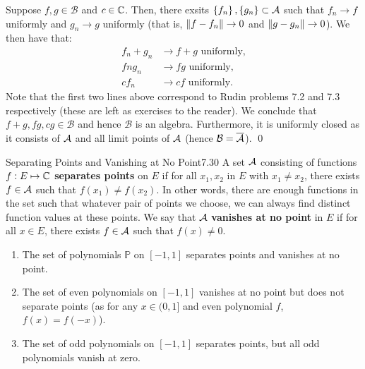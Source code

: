 \begin{nproof}
    Suppose $f, g \in \mathcal{B}$ and $c \in \mathbb{C}$. Then, there exsits $\set{f_n}, \set{g_n} \subset \mathcal{A}$ such that $f_n \rightarrow f$ uniformly and $g_n \rightarrow g$ uniformly (that is, $\norm{f - f_n} \rightarrow 0$ and $\norm{g - g_n} \rightarrow 0$). We then have that:
    \begin{align*}
        f_n + g_n &\rightarrow f + g \text{ uniformly,}
        \\ fng_n &\rightarrow fg \text{ uniformly,}
        \\ cf_n &\rightarrow cf \text{ uniformly.}
    \end{align*}
    Note that the first two lines above correspond to Rudin problems 7.2 and 7.3 respectively (these are left as exercises to the reader). We conclude that $f+g, fg, cg \in \mathcal{B}$ and hence $\mathcal{B}$ is an algebra. Furthermore, it is uniformly closed as it consists of $\mathcal{A}$ and all limit points of $\mathcal{A}$ (hence $\mathcal{B} = \overline{\mathcal{A}}$). \qed
\end{nproof}

\begin{definition}{Separating Points and Vanishing at No Point}{7.30}
    A set $\mathcal{A}$ consisting of functions $f: E \mapsto \mathbb{C}$ \textbf{separates points} on $E$ if for all $x_1, x_2$ in $E$ with $x_1 \neq x_2$, there exists $f \in \mathcal{A}$ such that $f(x_1) \neq f(x_2)$. In other words, there are enough functions in the set such that whatever pair of points we choose, we can always find distinct function values at these points. We say that $\mathcal{A}$ \textbf{vanishes at no point} in $E$ if for all $x \in E$, there exists $f \in \mathcal{A}$ such that $f(x) \neq 0$.
\end{definition}

\begin{nexample}{}{}
    \begin{enumerate}
        \item The set of polynomials $\mathbb{P}$ on $[-1, 1]$ separates points and vanishes at no point.
        \item The set of even polynomials on $[-1, 1]$ vanishes at no point but does not separate points (as for any $x \in (0, 1]$ and even polynomial $f$, $f(x) = f(-x)$).
        \item The set of odd polynomials on $[-1, 1]$ separates points, but all odd polynomials vanish at zero.
    \end{enumerate}
\end{nexample}

